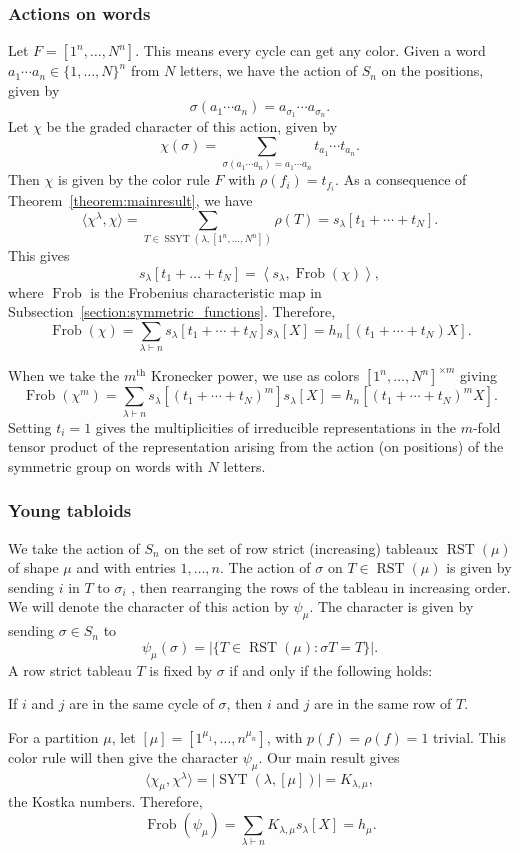 \documentclass[a4paper,12pt]{amsart}
\theoremstyle{plain}
\theoremstyle{definition}
\theoremstyle{remark}
\DeclareMathOperator{\Frob}{Frob}
\DeclareMathOperator{\RST}{RST}
\DeclareMathOperator{\SSYT}{SSYT}
\DeclareMathOperator{\SYT}{SYT}
\begin{document}
\subsubsection{Actions on words}

Let $F = [1^{n},\dots, N^n]$. This means every cycle can get any color.
Given a word $a_1\cdots a_{n} \in \{1,\dots, N\}^n$ from $N$ letters, we have the action of $S_n$ on the positions, given by 
\[
\sigma(a_1\cdots a_n) = a_{\sigma_1} \cdots a_{\sigma_n}.
\]
Let $\chi$ be the graded character of this action, given by
\[
\chi(\sigma) = \sum_{\sigma(a_1\cdots a_n)  = a_1\cdots a_n} t_{a_1} \cdots t_{a_n}.
\]
Then $\chi$ is given by the color rule $F$ with $\rho(f_i) = t_{f_i}.$
As a consequence of Theorem~\ref{theorem:mainresult}, we have
\[
\langle  \chi^{\lambda}, \chi \rangle = \sum_{T \in \SSYT(\lambda, [1^n,\dots, N^n] ) } \rho(T) = s_\lambda[t_1+\cdots + t_N].
\] 
This gives
\[
s_{\lambda}[t_1+\dots+ t_N] = \left\langle s_{\lambda},  \Frob(\chi) \right \rangle,
\]
where $\Frob$ is the Frobenius characteristic map in Subsection~\ref{section:symmetric_functions}.
Therefore,
$$
 \Frob(\chi) = \sum_{\lambda \vdash n} s_{\lambda}[t_1+ \cdots + t_N] s_{\lambda}[X] = h_n\left[ (t_1+\cdots + t_N) X\right].
$$

When we take the $m^{\text{th}}$ Kronecker power, we use as colors $[1^n,\dots, N^n]^{\times m}$ giving
\[
\Frob(\chi^{ m}) = \sum_{\lambda \vdash n} s_\lambda[(t_1+\cdots +t_N)^m ]s_{\lambda}[X] = h_n\left[ (t_1+\cdots + t_N)^m X \right].
\]
Setting $t_i =1$ gives the multiplicities of irreducible representations in the $m$-fold tensor product of the representation arising from the action (on positions) of the symmetric group on words with $N$ letters.
\subsubsection{Young tabloids} \label{section:young_tabloid}
We take the action of $S_n$ on the set of row strict (increasing) tableaux $\RST(\mu)$ of shape $\mu$ and with entries $1,\dots, n$.  The action of $\sigma$ on $T \in \RST(\mu)$ is given by sending $i$ in $T$ to $\sigma_i$ , then rearranging the rows of the tableau in increasing order. We will denote the character of this action by $\psi_\mu$. The character is given by sending $\sigma \in S_n$ to
$$
\psi_\mu(\sigma) = |\{T \in \RST(\mu): \sigma T = T \}|.
$$
A row strict tableau $T$ is 
fixed by $\sigma$ if and only if the following holds:
\begin{center}
If $i$ and $j$ are in the same cycle of $\sigma$, then $i$ and $j$ are in the same row of $T$.
\end{center}
 For a partition $\mu$, let $[\mu] = [1^{\mu_1},\dots, n^{\mu_n}]$, with $p(f) = \rho(f) = 1$ trivial. This color rule will then give the character $\psi_\mu$. Our main result gives
\[
\langle \chi_\mu, \chi^\lambda \rangle = |\SYT(\lambda, [\mu])| = K_{\lambda,\mu},
\]
the Kostka numbers.
 Therefore, 
\[
\Frob(\psi_\mu) = \sum_{\lambda \vdash n} K_{\lambda,\mu} s_{\lambda}[X] = h_{\mu}.
\]
\end{document}
